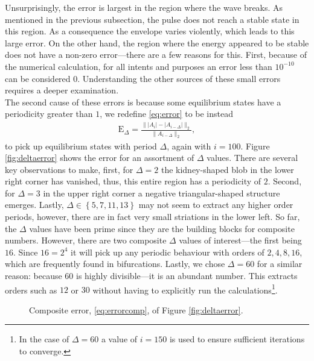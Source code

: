 Unsurprisingly, the error is largest in the region where the wave breaks. As mentioned in the previous subsection, the pulse does not reach a stable state in this region. As a consequence the envelope varies violently, which leads to this large error. On the other hand, the region where the energy appeared to be stable does not have a non-zero error---there are a few reasons for this. First, because of the numerical calculation, for all intents and purposes an error less than $10^{-10}$ can be considered $0$. Understanding the other sources of these small errors requires a deeper examination. \\

The second cause of these errors is because some equilibrium states have a periodicity greater than $1$, we redefine \eqref{eq:error} to be instead
\begin{align}
\textrm{E}_\Delta = \frac{\| |A_i| - |A_{i-\Delta}| \|_2}{\| A_{i-\Delta} \|_2},
\label{eq:deltaerror}
\end{align}
to pick up equilibrium states with period $\Delta$, again with $i = 100$. Figure \ref{fig:deltaerror} shows the error for an assortment of $\Delta$ values. There are several key observations to make, first, for $\Delta = 2$ the kidney-shaped blob in the lower right corner has vanished, thus, this entire region has a periodicity of $2$. Second, for $\Delta = 3$ in the upper right corner a negative triangular-shaped structure emerges. Lastly, $\Delta \in \left\{ 5, 7, 11, 13 \right\}$ may not seem to extract any higher order periods, however, there are in fact very small striations in the lower left. So far, the $\Delta$ values have been prime since they are the building blocks for composite numbers. However, there are two composite $\Delta$ values of interest---the first being $16$. Since $16 = 2^4$ it will pick up any periodic behaviour with orders of $2, 4, 8, 16$, which are frequently found in bifurcations. Lastly, we chose $\Delta = 60$ for a similar reason: because $60$ is highly divisible---it is an abundant number. This extracts orders such as $12$ or $30$ without having to explicitly run the calculations\footnote{In the case of $\Delta = 60$ a value of $i = 150$ is used to ensure sufficient iterations to converge.}. \\

\begin{figure}[tbp]

\caption[Composite error.]{Composite error, \eqref{eq:errorcomp}, of Figure \ref{fig:deltaerror}.}
\label{fig:errorcomp}
\end{figure}

